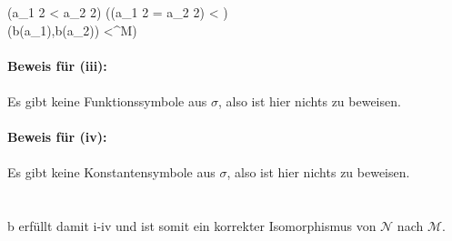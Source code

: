 \documentclass[a4paper,10pt]{article}
\newcommand{\rf}{\right\rfloor}
\newcommand{\lf}{\left\lfloor}
\begin{document}
\Leftrightarrow (a_1  2 < a_2  2) \vee ((a_1  2 = a_2  2) 
\wedge \lf {} \rf < \lf {} \rf ) \\
\Leftrightarrow (b(a_1),b(a_2)) \in <^{M}) \) \\
\\
\textbf{Beweis für (iii):} \\
\\
Es gibt keine Funktionssymbole aus $\sigma$, also ist hier nichts zu beweisen. \\
\\
\textbf{Beweis für (iv):} \\
\\
Es gibt keine Konstantensymbole aus $\sigma$, also ist hier nichts zu beweisen. \\
\\
\\
b erfüllt damit i-iv und ist somit ein korrekter Isomorphismus von $\mathcal{N}$ nach $\mathcal{M}$. 
\end{document}
